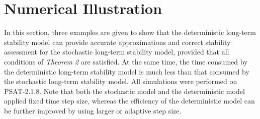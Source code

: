\documentclass[journal]{IEEEtran}
\begin{document}
\section{Numerical Illustration}\label{sectionnumerical}
In this section, three examples are given to show that the deterministic long-term stability model can provide accurate approximations and correct stability assessment for the stochastic long-term stability model, provided that all conditions of \textit{Theorem 2} are satisfied. At the same time, the time consumed by the deterministic long-term stability model is much less than that consumed by the stochastic long-term stability model. All simulations were performed on PSAT-2.1.8\cite{Milano:article}. Note that both the stochastic model and the deterministic model applied fixed time step size, whereas the efficiency of the deterministic model can be further improved by using larger or adaptive step size.
\end{document}
